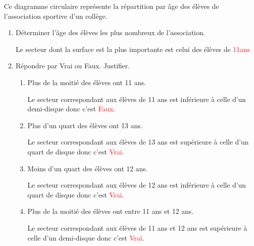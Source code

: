 \begin{corrige}
    Ce diagramme circulaire représente la répartition par âge des élèves de l'association sportive d'un collège.

    \begin{enumerate}
        \item Déterminer l'âge des élèves les plus nombreux de l'association.
        
        Le secteur dont la surface est la plus importante est celui des élèves de \textcolor{red}{11ans}
        \item Répondre par Vrai ou Faux. Justifier.
        \begin{enumerate}
            \item Plus de la moitié des élèves ont 11 ans.
            
            Le secteur correspondant aux élèves de 11 ans est inférieure à celle d'un demi-disque donc c'est \textcolor{red}{Faux}.
            \item Plus d'un quart des élèves ont 13 ans.
            
            Le secteur correspondant aux élèves de 13 ans est supérieure à celle d'un quart de disque donc c'est \textcolor{red}{Vrai}.
            \item Moins d'un quart des élèves ont 12 ans.
            
            Le secteur correspondant aux élèves de 12 ans est inférieure à celle d'un quart de disque donc c'est \textcolor{red}{Vrai}.
            \item Plus de la moitié des élèves ont entre 11 ans et 12 ans.
            
            Le secteur correspondant aux élèves de 11 ans et 12 ans est supérieure à celle d'un demi-disque donc c'est \textcolor{red}{Vrai}.
        \end{enumerate}
    \end{enumerate}
\end{corrige}

